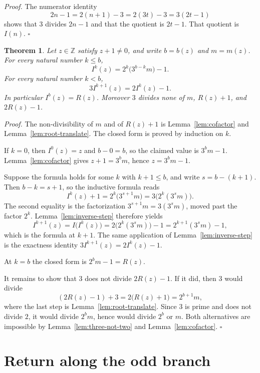 \documentclass[11pt,letterpaper]{article}
\newcommand{\Z}{\mathbb{Z}}
\newtheorem{theorem}{Theorem}
\newenvironment{proof}{\noindent\textit{Proof.}}{\hfill\(\square\)}
\begin{document}
\begin{proof}
The numerator identity
\[
2n-1=2(n+1)-3=2(3t)-3=3(2t-1)
\]
shows that \(3\) divides \(2n-1\) and that the quotient is \(2t-1\). That quotient is \(I(n)\).
\end{proof}

\begin{theorem}
\label{thm:inverse-root}
Let \(z\in\Z\) satisfy \(z+1\neq 0\), and write \(b=b(z)\) and \(m=m(z)\). For every natural number \(k\leq b\),
\[
I^k(z)=2^k\bigl(3^{b-k}m\bigr)-1.
\]
For every natural number \(k<b\),
\[
3I^{k+1}(z)=2I^k(z)-1.
\]
In particular \(I^b(z)=R(z)\). Moreover \(3\) divides none of \(m\), \(R(z)+1\), and \(2R(z)-1\).
\end{theorem}

\begin{proof}
The non-divisibility of \(m\) and of \(R(z)+1\) is Lemma~\ref{lem:cofactor} and Lemma~\ref{lem:root-translate}. The closed form is proved by induction on \(k\).

If \(k=0\), then \(I^0(z)=z\) and \(b-0=b\), so the claimed value is \(3^bm-1\). Lemma~\ref{lem:cofactor} gives \(z+1=3^bm\), hence \(z=3^bm-1\).

Suppose the formula holds for some \(k\) with \(k+1\leq b\), and write \(s=b-(k+1)\). Then \(b-k=s+1\), so the inductive formula reads
\[
I^k(z)+1=2^k\bigl(3^{s+1}m\bigr)=3\bigl(2^k(3^sm)\bigr).
\]
The second equality is the factorization \(3^{s+1}m=3(3^sm)\), moved past the factor \(2^k\). Lemma~\ref{lem:inverse-step} therefore yields
\[
I^{k+1}(z)=I\bigl(I^k(z)\bigr)=2\bigl(2^k(3^sm)\bigr)-1=2^{k+1}(3^sm)-1,
\]
which is the formula at \(k+1\). The same application of Lemma~\ref{lem:inverse-step} is the exactness identity \(3I^{k+1}(z)=2I^k(z)-1\).

At \(k=b\) the closed form is \(2^bm-1=R(z)\).

It remains to show that \(3\) does not divide \(2R(z)-1\). If it did, then \(3\) would divide
\[
(2R(z)-1)+3=2\bigl(R(z)+1\bigr)=2^{b+1}m,
\]
where the last step is Lemma~\ref{lem:root-translate}. Since \(3\) is prime and does not divide \(2\), it would divide \(2^bm\), hence would divide \(2^b\) or \(m\). Both alternatives are impossible by Lemma~\ref{lem:three-not-two} and Lemma~\ref{lem:cofactor}.
\end{proof}

\section{Return along the odd branch}
\end{document}
